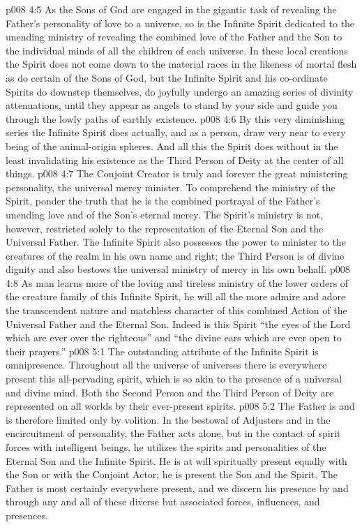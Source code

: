 \vs p008 4:5 As the Sons of God are engaged in the gigantic task of revealing the Father’s personality of love to a universe, so is the Infinite Spirit dedicated to the unending ministry of revealing the combined love of the Father and the Son to the individual minds of all the children of each universe. In these local creations the Spirit does not come down to the material races in the likeness of mortal flesh as do certain of the Sons of God, but the Infinite Spirit and his co\hyp{}ordinate Spirits do downstep themselves, do joyfully undergo an amazing series of divinity attenuations, until they appear as angels to stand by your side and guide you through the lowly paths of earthly existence.
\vs p008 4:6 By this very diminishing series the Infinite Spirit does actually, and as a person, draw very near to every being of the animal\hyp{}origin spheres. And all this the Spirit does without in the least invalidating his existence as the Third Person of Deity at the center of all things.
\vs p008 4:7 \pc The Conjoint Creator is truly and forever the great ministering personality, the universal mercy minister. To comprehend the ministry of the Spirit, ponder the truth that he is the combined portrayal of the Father’s unending love and of the Son’s eternal mercy. The Spirit’s ministry is not, however, restricted solely to the representation of the Eternal Son and the Universal Father. The Infinite Spirit also possesses the power to minister to the creatures of the realm in his own name and right; the Third Person is of divine dignity and also bestows the universal ministry of mercy in his own behalf.
\vs p008 4:8 As man learns more of the loving and tireless ministry of the lower orders of the creature family of this Infinite Spirit, he will all the more admire and adore the transcendent nature and matchless character of this combined Action of the Universal Father and the Eternal Son. Indeed is this Spirit “the eyes of the Lord which are ever over the righteous” and “the divine ears which are ever open to their prayers.”
\vs p008 5:1 The outstanding attribute of the Infinite Spirit is omnipresence. Throughout all the universe of universes there is everywhere present this all\hyp{}pervading spirit, which is so akin to the presence of a universal and divine mind. Both the Second Person and the Third Person of Deity are represented on all worlds by their ever\hyp{}present spirits.
\vs p008 5:2 The Father is  and is therefore limited only by volition. In the bestowal of Adjusters and in the encircuitment of personality, the Father acts alone, but in the contact of spirit forces with intelligent beings, he utilizes the spirits and personalities of the Eternal Son and the Infinite Spirit. He is at will spiritually present equally with the Son or with the Conjoint Actor; he is present  the Son and  the Spirit. The Father is most certainly everywhere present, and we discern his presence by and through any and all of these diverse but associated forces, influences, and presences.
